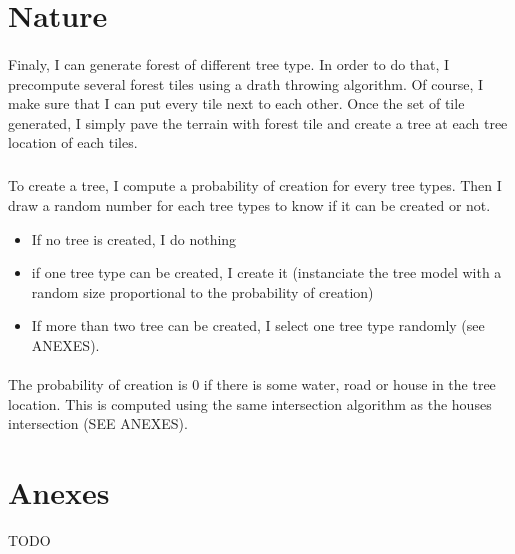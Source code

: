 \documentclass[a4paper,12pt]{article}
\begin{document}
\section*{Nature}

\paragraph{} Finaly, I can generate forest of different tree type. In order to do that, I precompute several forest tiles using a drath throwing algorithm. Of course, I make sure that I can put every tile next to each other. Once the set of tile generated, I simply pave the terrain with forest tile and create a tree at each tree location of each tiles.

\subparagraph{} To create a tree, I compute a probability of creation for every tree types. Then I draw a random number for each tree types to know if it can be created or not.
\begin{itemize}
	\item If no tree is created, I do nothing
	\item if one tree type can be created, I create it (instanciate the tree model with a random size proportional to the probability of creation)
	\item If more than two tree can be created, I select one tree type randomly (see ANEXES).
\end{itemize}

\paragraph{} The probability of creation is $0$ if there is some water, road or house in the tree location. This is computed using the same intersection algorithm as the houses intersection (SEE ANEXES).

\section*{Anexes}

TODO
\end{document}
